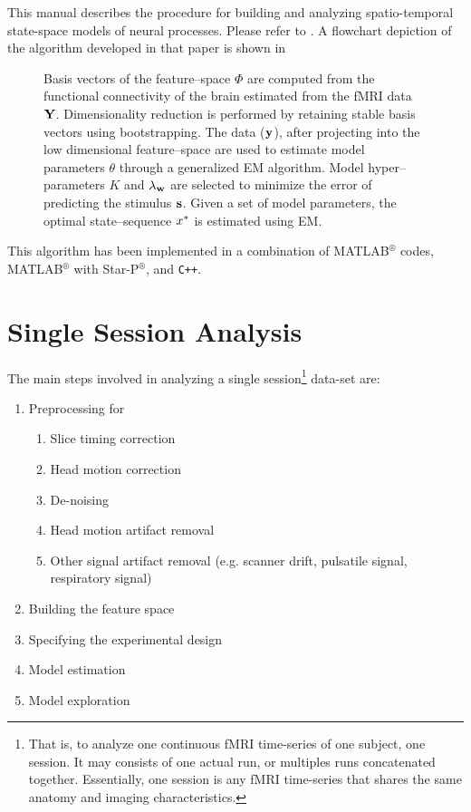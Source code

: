 This manual describes the procedure for building and analyzing
spatio-temporal state-space models of neural processes. Please refer
to \citet{Janoos2011}. A flowchart depiction of the algorithm
developed in that paper is shown in 

\begin{figure}[h!]
  \caption[Outline of Method]{
  Basis vectors of the feature--space $\Phi$ are computed from the functional
  connectivity of the brain estimated from
  the fMRI data ${\mathbf{Y}}$.  Dimensionality reduction is performed
  by retaining stable basis vectors using bootstrapping.
  The data (${\mathbf{y}}$), after projecting into the low dimensional feature--space
 are used to estimate model   parameters $\theta$ through a
  generalized EM algorithm.
  Model hyper--parameters $K$ and $\lambda_{\mathbf{w}}$ are selected
  to minimize the error of predicting the stimulus ${\mathbf{s}}$.
  Given a set of model parameters, the optimal
  state--sequence ${x}^*$ is estimated using EM.
  }\label{fig:pipeline}
\end{figure}

This algorithm has been implemented in a combination of
MATLAB$^\circledR$ codes, MATLAB$^\circledR$ with
Star-P$^\circledR$, and \verb"C++".

\section{Single Session Analysis}
The main steps involved in analyzing a single session\footnote{That
is, to analyze one continuous fMRI time-series of one subject, one
session. It may consists of one actual run, or multiples runs
concatenated together. Essentially, one session is any fMRI
time-series that shares the same anatomy and imaging
characteristics.} data-set are:
\begin{enumerate}[i]
  \item Preprocessing for
  \begin{enumerate}
    \item Slice timing correction
    \item Head motion correction
    \item De-noising
    \item Head motion artifact removal
    \item Other signal artifact removal (e.g. scanner drift, pulsatile signal, respiratory signal)
  \end{enumerate}
  \item Building the feature space
  \item Specifying the experimental design
  \item Model estimation
  \item Model exploration
\end{enumerate}

